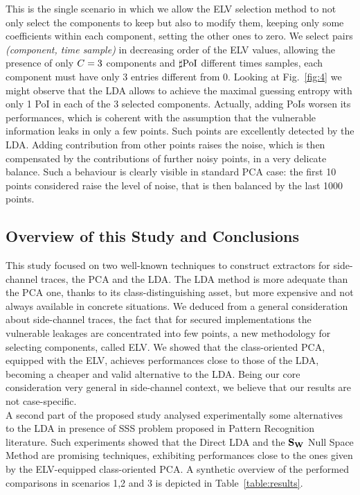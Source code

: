 This is the single scenario in which we allow the ELV selection method to not only select the components to keep but also to modify them, keeping only some coefficients within each component, setting the other ones to zero. We select pairs \textit{(component, time sample)} in decreasing order of the ELV values, allowing the presence of only $C = 3$ components and $\sharp\mathrm{PoI}$ different times samples, \ie each component must have only 3 entries different from 0.
Looking at Fig.~\ref{fig:4} we might observe that the LDA allows to achieve the maximal guessing entropy with only 1 PoI in each of the 3 selected components. 
Actually, adding PoIs worsen its performances, which is coherent with the assumption that the vulnerable information leaks in only a few points. Such points are excellently detected by the LDA. Adding contribution from other points raises the noise, which is then compensated by the contributions of further noisy points, in a very delicate balance. Such a behaviour is clearly visible in standard PCA case: the first 10 points considered raise the level of noise, that is then balanced by the last 1000 points.


\subsection{Overview of this Study and Conclusions}


This study focused on two well-known techniques to construct extractors for side-channel traces, the PCA and the LDA. The LDA method is more adequate than the PCA one, thanks to its class-distinguishing asset, but more expensive and not always available in concrete situations. We deduced from a general consideration about side-channel traces, \ie the fact that for secured implementations the vulnerable leakages are concentrated into few points, a new methodology  for selecting components, called ELV. We showed that the class-oriented PCA, equipped with the ELV, achieves performances close to those of the LDA, becoming a cheaper and valid alternative to the LDA. Being our core consideration very general in side-channel context, we believe that our results are not case-specific.  \\
A second part of the proposed study analysed experimentally some alternatives to the LDA in presence of SSS problem proposed in Pattern Recognition literature. Such experiments showed that the Direct LDA and the $\textbf{S}_{\textbf{W}}$ Null Space Method are promising techniques, exhibiting performances close to the ones given by the ELV-equipped class-oriented PCA. A synthetic overview of the performed comparisons in scenarios 1,2 and 3 is depicted in Table~\ref{table:results}.

